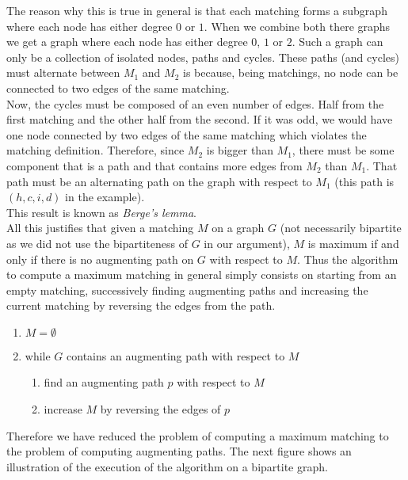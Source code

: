 \documentclass[a4paper,10pt]{article}
\begin{document}
The reason why this is true in general is that each matching
forms a subgraph where each node has either degree $0$ or $1$. When we combine
both there graphs we get a graph where each node has either degree $0$, $1$
or $2$. Such a graph can only be a collection of isolated nodes, paths
and cycles. These paths (and cycles) must alternate between $M_1$ and $M_2$ is because,
being matchings, no node can be connected to two edges of the same matching. \\

Now, the cycles must be composed of an even number of edges. Half from
the first matching and the other half from the second. If it was odd, we would have one node connected
by two edges of the same matching which violates the matching definition. Therefore, since
$M_2$ is bigger than $M_1$, there must be some component that is a path
and that contains more edges from $M_2$ than $M_1$. That path must be
an alternating path on the graph with respect to $M_1$ (this path is $(h, c, i, d)$ in
the example). \\

This result is known as \emph{Berge's lemma}. \\

All this justifies that given a matching $M$ on a graph $G$ (not necessarily bipartite as we did not use
the bipartiteness of $G$ in our argument), $M$
is maximum if and only if there is no augmenting path on $G$ with respect to $M$. Thus the algorithm
to compute a maximum matching in general simply consists on starting from an empty matching, successively
finding augmenting paths and increasing the current matching by reversing the edges from the path.

\begin{enumerate}
 \item $M = \emptyset$
 \item while $G$ contains an augmenting path with respect to $M$
\begin{enumerate}
 \item find an augmenting path $p$ with respect to $M$
 \item increase $M$ by reversing the edges of $p$
\end{enumerate} 
\end{enumerate}

Therefore we have reduced the problem of computing a maximum matching to the problem of computing augmenting paths.
The next figure shows an illustration of the execution of the algorithm on a bipartite
graph.
\end{document}
